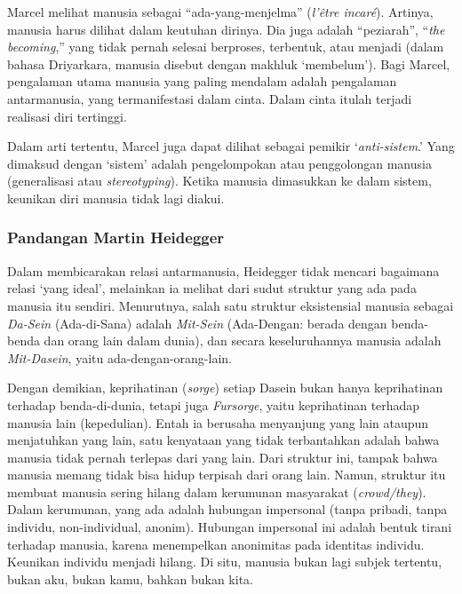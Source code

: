 \documentclass[10pt,a4paper]{article}
\begin{document}
\begin{multicols}{2}
Marcel melihat manusia sebagai ``ada-yang-menjelma'' (\emph{l'être
incaré}). Artinya, manusia harus dilihat dalam keutuhan dirinya. Dia
juga adalah ``peziarah'', ``\emph{the becoming},'' yang tidak pernah
selesai berproses, terbentuk, atau menjadi (dalam bahasa Driyarkara,
manusia disebut dengan makhluk `membelum'). Bagi Marcel, pengalaman
utama manusia yang paling mendalam adalah pengalaman antarmanusia, yang
termanifestasi dalam cinta. Dalam cinta itulah terjadi realisasi diri
tertinggi.

Dalam arti tertentu, Marcel juga dapat dilihat sebagai pemikir
`\emph{anti-sistem}.' Yang dimaksud dengan `sistem' adalah pengelompokan
atau penggolongan manusia (generalisasi atau \emph{stereotyping}).
Ketika manusia dimasukkan ke dalam sistem, keunikan diri manusia tidak
lagi diakui.

\hypertarget{pandangan-martin-heidegger}{%
\subsubsection{Pandangan Martin
Heidegger}\label{pandangan-martin-heidegger}}

Dalam membicarakan relasi antarmanusia, Heidegger tidak mencari
bagaimana relasi `yang ideal', melainkan ia melihat dari sudut struktur
yang ada pada manusia itu sendiri. Menurutnya, salah satu struktur
eksistensial manusia sebagai \emph{Da-Sein} (Ada-di-Sana) adalah
\emph{Mit-Sein} (Ada-Dengan: berada dengan benda-benda dan orang lain
dalam dunia), dan secara keseluruhannya manusia adalah
\emph{Mit-Dasein}, yaitu ada-dengan-orang-lain.

Dengan demikian, keprihatinan (\emph{sorge}) setiap Dasein bukan hanya
keprihatinan terhadap benda-di-dunia, tetapi juga \emph{Fursorge}, yaitu
keprihatinan terhadap manusia lain (kepedulian). Entah ia berusaha
menyanjung yang lain ataupun menjatuhkan yang lain, satu kenyataan yang
tidak terbantahkan adalah bahwa manusia tidak pernah terlepas dari yang
lain. Dari struktur ini, tampak bahwa manusia memang tidak bisa hidup
terpisah dari orang lain. Namun, struktur itu membuat manusia sering
hilang dalam kerumunan masyarakat (\emph{crowd/they}). Dalam kerumunan,
yang ada adalah hubungan impersonal (tanpa pribadi, tanpa individu,
non-individual, anonim). Hubungan impersonal ini adalah bentuk tirani
terhadap manusia, karena menempelkan anonimitas pada identitas individu.
Keunikan individu menjadi hilang. Di situ, manusia bukan lagi subjek
tertentu, bukan aku, bukan kamu, bahkan bukan kita.


\end{multicols}
\end{document}
